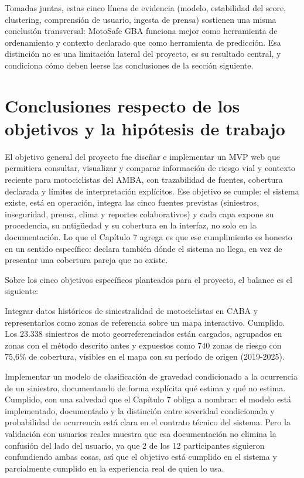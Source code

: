 Tomadas juntas, estas cinco líneas de evidencia (modelo, estabilidad del
score, clustering, comprensión de usuario, ingesta de prensa) sostienen
una misma conclusión transversal: MotoSafe GBA funciona mejor como
herramienta de ordenamiento y contexto declarado que como herramienta de
predicción. Esa distinción no es una limitación lateral del proyecto, es
su resultado central, y condiciona cómo deben leerse las conclusiones de
la sección siguiente.

\section{Conclusiones respecto de los objetivos y la hipótesis de trabajo}

El objetivo general del proyecto fue diseñar e implementar un MVP web
que permitiera consultar, visualizar y comparar información de riesgo
vial y contexto reciente para motociclistas del AMBA, con trazabilidad
de fuentes, cobertura declarada y límites de interpretación explícitos.
Ese objetivo se cumple: el sistema existe, está en operación, integra
las cinco fuentes previstas (siniestros, inseguridad, prensa, clima y
reportes colaborativos) y cada capa expone su procedencia, su antigüedad
y su cobertura en la interfaz, no solo en la documentación. Lo que el
Capítulo 7 agrega es que ese cumplimiento es honesto en un sentido
específico: declara también dónde el sistema no llega, en vez de
presentar una cobertura pareja que no existe.

Sobre los cinco objetivos específicos planteados para el proyecto, el
balance es el siguiente:

Integrar datos históricos de siniestralidad de motociclistas en CABA y
representarlos como zonas de referencia sobre un mapa interactivo.
Cumplido. Los 23.338 siniestros de moto georreferenciados están
cargados, agrupados en zonas con el método descrito antes y expuestos
como 740 zonas de riesgo con 75,6\% de cobertura, visibles en el mapa
con su período de origen (2019-2025).

Implementar un modelo de clasificación de gravedad condicionado a la
ocurrencia de un siniestro, documentando de forma explícita qué estima y
qué no estima. Cumplido, con una salvedad que el Capítulo 7 obliga a
nombrar: el modelo está implementado, documentado y la distinción entre
severidad condicionada y probabilidad de ocurrencia está clara en el
contrato técnico del sistema. Pero la validación con usuarios reales
muestra que esa documentación no elimina la confusión del lado del
usuario, ya que 2 de los 12 participantes siguieron confundiendo ambas
cosas, así que el objetivo está cumplido en el sistema y parcialmente
cumplido en la experiencia real de quien lo usa.

